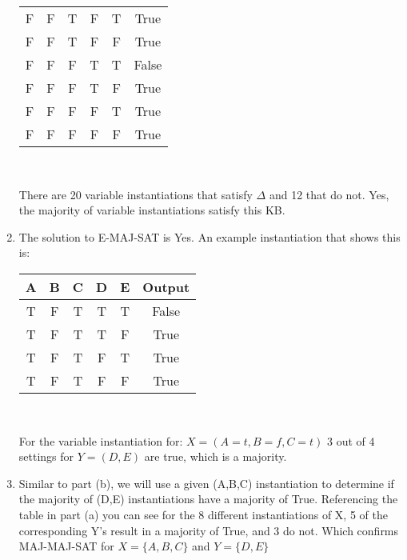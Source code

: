 \documentclass{article}
\begin{document}
\begin{enumerate}
\begin{center}
\begin{tabular}{ |c|c|c|c|c|c| }
            F&F&T&F&T&True \\
            F&F&T&F&F&True \\
            \hline
            F&F&F&T&T&False \\
            F&F&F&T&F&True \\
            F&F&F&F&T&True \\
            F&F&F&F&F&True \\
             \hline
            \end{tabular} \\
        \end{center}
        There are 20 variable instantiations that satisfy $\Delta$ and 12 that do not. Yes, the majority of variable instantiations satisfy this KB.
        \item The solution to E-MAJ-SAT is Yes.  An example instantiation that  shows this is:
        \begin{center}
           \begin{tabular}{ |c|c|c|c|c|c| }
                \hline
                 A&B&C&D&E&Output \\ 
                 \hline
                T&F&T&T&T&False \\
                T&F&T&T&F&True \\
                T&F&T&F&T&True \\
                T&F&T&F&F&True \\
                 \hline
                \end{tabular} \\
        \end{center}
        For the variable instantiation for: $X = (A=t, B=f, C=t)$ 3 out of 4 settings for $Y = (D,E)$ are true, which is a majority.
        
        \item Similar to part (b), we will use a given (A,B,C) instantiation to determine if the majority of (D,E) instantiations have a majority of True. Referencing the table in part (a) you can see for the 8 different instantiations of X, 5 of the corresponding Y's result in a majority of True, and 3 do not.  Which confirms MAJ-MAJ-SAT for $X=\{A,B,C\}$ and $Y=\{D,E\}$
 \end{enumerate}
 \clearpage
\end{document}
